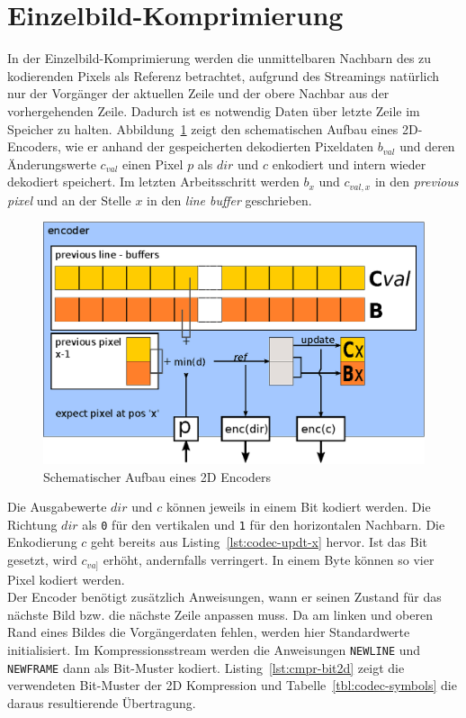 \section{Einzelbild-Komprimierung}
\label{sec:codec2d}
In der Einzelbild-Komprimierung werden die unmittelbaren Nachbarn des zu
kodierenden Pixels als Referenz betrachtet, aufgrund des Streamings nat\"urlich
nur der Vorg\"anger der aktuellen Zeile und der obere Nachbar aus der
vorhergehenden Zeile. Dadurch ist es notwendig Daten \"uber letzte Zeile im
Speicher zu halten. Abbildung~\ref{fig:codec-enc2d} zeigt den schematischen
Aufbau eines 2D-Encoders, wie er anhand der gespeicherten dekodierten Pixeldaten
$b_{val}$ und deren \"Anderungswerte $c_{val}$ einen Pixel $p$ als $dir$ und $c$
enkodiert und intern wieder dekodiert speichert. Im letzten Arbeitsschritt
werden $b_x$ und $c_{val,x}$ in den \textit{previous pixel} und an der Stelle
$x$ in den \textit{line buffer} geschrieben.\\
%
\begin{figure}[tb]
\begin{center}
\includegraphics{img/codec-enc2d}
\end{center}
\caption{Schematischer Aufbau eines 2D Encoders}
\label{fig:codec-enc2d}
\end{figure}
%
Die Ausgabewerte $dir$ und $c$ k\"onnen jeweils in einem Bit kodiert werden. Die
Richtung $dir$ als \texttt{0} f\"ur den vertikalen und \texttt{1} f\"ur den
horizontalen Nachbarn. Die Enkodierung $c$ geht bereits aus
Listing~\ref{lst:codec-updt-x} hervor. Ist das Bit gesetzt, wird $c_{va]}$
erh\"oht, andernfalls verringert. In einem Byte k\"onnen so vier Pixel kodiert
werden.
\\
Der Encoder ben\"otigt zus\"atzlich Anweisungen, wann er seinen Zustand f\"ur
das n\"achste Bild bzw. die n\"achste Zeile anpassen muss. Da am linken und oberen
Rand eines Bildes die Vorg\"angerdaten fehlen, werden hier Standardwerte
initialisiert. Im Kompressionsstream werden die Anweisungen \texttt{NEWLINE} 
und \texttt{NEWFRAME} dann als Bit-Muster kodiert. Listing~\ref{lst:cmpr-bit2d} zeigt die 
verwendeten Bit-Muster der 2D Kompression und Tabelle~\ref{tbl:codec-symbols} die 
daraus resultierende \"Ubertragung.

